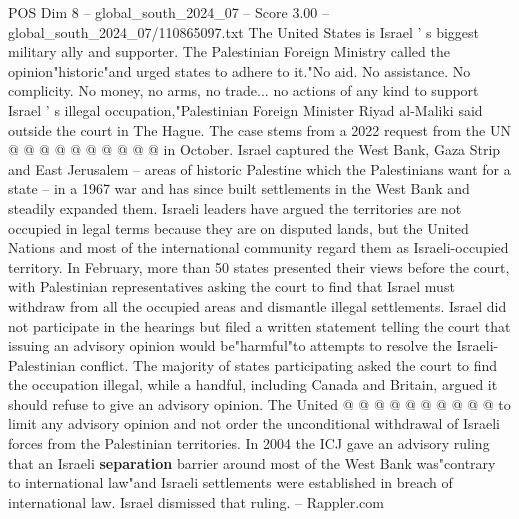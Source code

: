 \begin{textsample}{POS Dim 8 – global\_south\_2024\_07 – Score 3.00 – global\_south\_2024\_07/110865097.txt}
The United States is Israel ' s biggest military ally and supporter.
The Palestinian Foreign Ministry called the opinion"historic"and urged states to adhere to it."No aid.
No assistance.
No complicity.
No money, no arms, no trade... no actions of any kind to support Israel ' s illegal occupation,"Palestinian Foreign Minister Riyad al-Maliki said outside the court in The Hague.
The case stems from a 2022 request from the UN @ @ @ @ @ @ @ @ @ @ in October.
Israel captured the West Bank, Gaza Strip and East Jerusalem -- areas of historic Palestine which the Palestinians want for a state -- in a 1967 war and has since built settlements in the West Bank and steadily expanded them.
Israeli leaders have argued the territories are not occupied in legal terms because they are on disputed lands, but the United Nations and most of the international community regard them as Israeli-occupied territory.
In February, more than 50 states presented their views before the court, with Palestinian representatives asking the court to find that Israel must withdraw from all the occupied areas and dismantle illegal settlements.
Israel did not participate in the hearings but filed a written statement telling the court that issuing an advisory opinion would be"harmful"to attempts to resolve the Israeli-Palestinian conflict.
The majority of states participating asked the court to find the occupation illegal, while a handful, including Canada and Britain, argued it should refuse to give an advisory opinion.
The United @ @ @ @ @ @ @ @ @ @ to limit any advisory opinion and not order the unconditional withdrawal of Israeli forces from the Palestinian territories.
In 2004 the ICJ gave an advisory ruling that an Israeli \textbf{separation} barrier around most of the West Bank was"contrary to international law"and Israeli settlements were established in breach of international law.
Israel dismissed that ruling. -- Rappler.com

\end{textsample}
